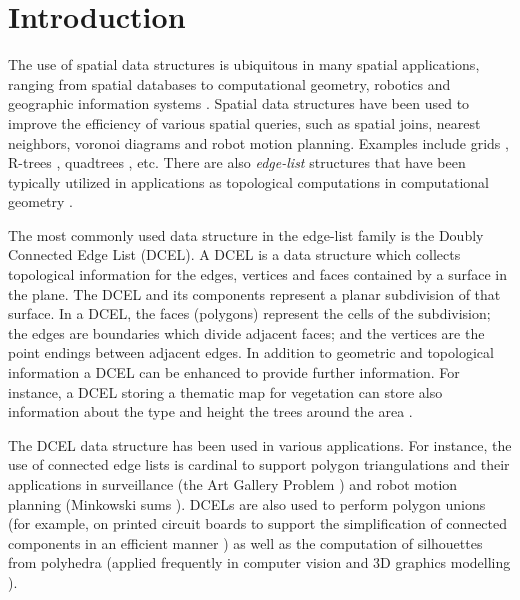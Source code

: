 \section{Introduction}
The use of spatial data structures is ubiquitous in many spatial applications, ranging from spatial databases to computational geometry, robotics and geographic information systems \cite{samet-book}. 
Spatial data structures have been used to improve the efficiency of various spatial queries, such as spatial joins, nearest neighbors, voronoi diagrams and robot motion planning.
Examples include grids \cite{gridfile}, R-trees \cite{rtree, rstar}, quadtrees \cite{quadtree}, etc.
There are also \textit{edge-list}  structures that have been typically utilized in applications as topological computations in computational geometry \cite{berg_computational_2008}.

The most commonly used data structure in the edge-list family is the Doubly Connected Edge List (DCEL).  A DCEL \cite{muller_finding_1978, preparata_computational_1985} is a data structure which collects topological information for the edges, vertices and faces contained by a surface in the plane. The DCEL and its components represent a planar subdivision of that surface. In a DCEL, the faces (polygons) represent the cells of the subdivision; the edges are boundaries which divide adjacent faces; and the vertices are the point endings between adjacent edges.
In addition to geometric and topological information a DCEL can be enhanced to provide further information.  For instance, a DCEL storing a thematic map for vegetation can store also information about the type and height the trees around the area \cite{berg_computational_2008}. 

The DCEL data structure has been used in various applications. For instance, the use of connected edge lists is cardinal to support polygon triangulations and their applications in surveillance (the Art Gallery Problem \cite{chvatal_combinatorial_1975, orourke_art_1987}) and robot motion planning (Minkowski sums \cite{berg_computational_2008, chew_convex_1993}).  DCELs are also used to perform polygon unions (for example, on printed circuit boards to support the simplification of connected components in an efficient manner \cite{fogel_cgal_2012}) as well as the computation of silhouettes from polyhedra \cite{fogel_cgal_2012, berberich_arrangements_2010} (applied frequently in computer vision and 3D graphics modelling \cite{boguslawski_modelling_2011}).

